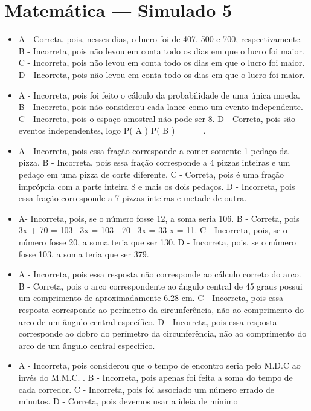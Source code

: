\section*{Matemática — Simulado 5} 
\begin{itemize}
\item A - Correta, pois, nesses dias, o lucro foi de 407, 500 e 700,
respectivamente.
B - Incorreta, pois não levou em conta todo os dias em que o lucro foi
maior.
C - Incorreta, pois não levou em conta todo os dias em que o lucro foi
maior.
D - Incorreta, pois não levou em conta todo os dias em que o lucro foi
maior.
\item A - Incorreta, pois foi feito o cálculo da probabilidade de uma única
moeda.
B - Incorreta, pois não considerou cada lance como um evento
independente.
C - Incorreta, pois o espaço amostral não pode ser 8.
D - Correta, pois são eventos independentes, logo
P\left( A \right) \times P\left( B \right) = \  \times {} = .
\item A - Incorreta, pois essa fração corresponde a comer somente 1 pedaço da
pizza.
B - Incorreta, pois essa fração corresponde a 4 pizzas inteiras e um
pedaço em uma pizza de corte diferente.
C - Correta, pois é uma fração imprópria com a parte inteira 8 e mais os
dois pedaços.
D - Incorreta, pois essa fração corresponde a 7 pizzas inteiras e metade
de outra.
\item A- Incorreta, pois, se o número fosse 12, a soma seria 106.
B - Correta, pois 3x + 70 = 103 \rightarrow \ 3x = 103 - 70 \rightarrow \ 3x = 33 \rightarrow x = 11.
C - Incorreta, pois, se o número fosse 20, a soma teria que ser 130.
D - Incorreta, pois, se o número fosse 103, a soma teria que ser 379.
\item A - Incorreta, pois essa resposta não corresponde ao cálculo correto do
arco.
B - Correta, pois o arco correspondente ao ângulo central de 45 graus
possui um comprimento de aproximadamente 6.28 cm.
C - Incorreta, pois essa resposta corresponde ao perímetro da
circunferência, não ao comprimento do arco de um ângulo central
específico.
D - Incorreta, pois essa resposta corresponde ao dobro do perímetro da
circunferência, não ao comprimento do arco de um ângulo central
específico.
\item A - Incorreta, pois considerou que o tempo de encontro seria pelo M.D.C
ao invés do M.M.C. . B - Incorreta, pois apenas foi feita a soma do
tempo de cada corredor. C - Incorreta, pois foi associado um número
errado de minutos. D - Correta, pois devemos usar a ideia de mínimo

\end{itemize}
